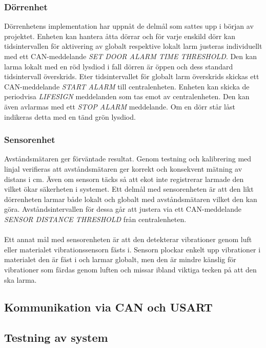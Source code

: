 \documentclass{article}
\begin{document}
\subsubsection{Dörrenhet}
Dörrenhetens implementation har uppnåt de delmål som sattes upp i början av projektet. 
Enheten kan hantera åtta dörrar och för varje enskild dörr kan tidsintervallen för aktivering av globalt respektive lokalt larm justeras individuellt med ett CAN-meddelande \emph{SET DOOR ALARM TIME THRESHOLD}. 
Den kan larma lokalt med en röd lysdiod i fall dörren är öppen och dess standard tidsintervall överskrids.
Eter tidsintervallet för globalt larm överskrids skickas ett CAN-meddelande \emph{START ALARM} till centralenheten.
Enheten kan skicka de periodvisa \emph{LIFESIGN} meddelanden som tas emot av centralenheten.
Den kan även avlarmas med ett \emph{STOP ALARM} meddelande. 
Om en dörr står låst indikeras detta med en tänd grön lysdiod.

\subsubsection{Sensorenhet}
Avståndsmätaren ger förväntade resultat.
Genom testning och kalibrering med linjal verifieras att avståndsmätaren ger korrekt och konsekvent mätning av distans i cm.
Även om sensorn täcks så att ekot inte registrerar larmade den vilket ökar säkerheten i systemet. 
Ett delmål med sensorenheten är att den likt dörrenheten larmar både lokalt och globalt med avståndsmätaren vilket den kan göra. 
Avståndsintervallen för dessa går att justera via ett CAN-meddelande \emph{SENSOR DISTANCE THRESHOLD} från centralenheten.\\
\\
Ett annat mål med sensorenheten är att den detekterar vibrationer genom luft eller materialet vibrationssensorn fästs i. Sensorn plockar enkelt upp vibrationer i materialet den är fäst i och larmar globalt, men den är mindre känslig för vibrationer som färdas genom luften och missar ibland viktiga tecken på att den ska larma.

\subsection{Kommunikation via CAN och USART}

\subsection{Testning av system}
\end{document}
